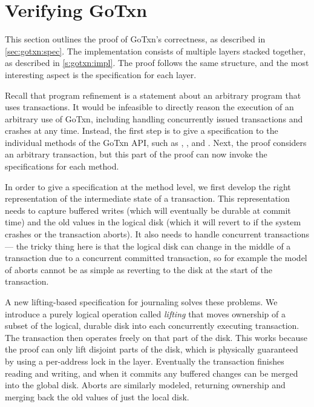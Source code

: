 \section{Verifying GoTxn}
\label{s:proof}

This section outlines the proof of GoTxn's correctness, as described in
\cref{sec:gotxn:spec}. The implementation consists of multiple layers stacked
together, as described in \cref{s:gotxn:impl}. The proof follows the same
structure, and the most interesting aspect is the specification for each layer.

Recall that program refinement is a statement about an arbitrary program that
uses transactions. It would be infeasible to directly reason the execution of an
arbitrary use of GoTxn, including handling concurrently issued transactions and
crashes at any time. Instead, the first step is to give a specification to the
individual methods of the GoTxn API, such as , , and
. Next, the proof considers an arbitrary transaction, but this part
of the proof can now invoke the specifications for each method.

In order to give a specification at the method level, we first
develop the right representation of the intermediate state of a transaction.
This representation needs to capture buffered writes (which will eventually be
durable at commit time) and the old values in the logical disk (which it will
revert to if the system crashes or the transaction aborts). It also needs to
handle concurrent transactions --- the tricky thing here is that the logical
disk can change in the middle of a transaction due to a concurrent committed
transaction, so for example the model of aborts cannot be as simple as reverting
to the disk at the start of the transaction.

A new lifting-based specification for journaling solves these problems. We
introduce a purely logical operation called \emph{lifting} that moves ownership
of a subset of the logical, durable disk into each concurrently executing
transaction. The transaction then operates freely on that part of the disk. This
works because the proof can only lift disjoint parts of the disk, which is
physically guaranteed by using a per-address lock in the  layer.
Eventually the transaction finishes reading and writing, and when it commits any
buffered changes can be merged into the global disk. Aborts are similarly
modeled, returning ownership and merging back the old values of just the local
disk.




